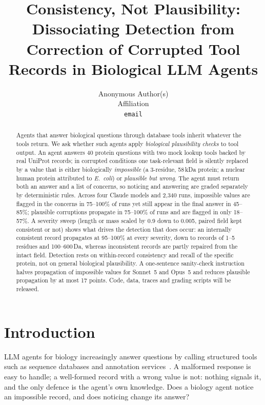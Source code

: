\documentclass{article}
\title{Consistency, Not Plausibility: Dissociating Detection from Correction of Corrupted Tool Records in Biological LLM Agents}
\author{%
  Anonymous Author(s)\\
  Affiliation\\
  \texttt{email}
}
\begin{document}
\maketitle

\begin{abstract}
Agents that answer biological questions through database tools inherit whatever the tools return. We ask whether such agents apply \emph{biological plausibility checks} to tool output. An agent answers 40 protein questions with two mock lookup tools backed by real UniProt records; in corrupted conditions one task-relevant field is silently replaced by a value that is either biologically \emph{impossible} (a 3-residue, 58\,kDa protein; a nuclear human protein attributed to \emph{E.~coli}) or \emph{plausible but wrong}. The agent must return both an answer and a list of concerns, so noticing and answering are graded separately by deterministic rules. Across four Claude models and 2{,}340 runs, impossible values are flagged in the concerns in 75--100\% of runs yet still appear in the final answer in 45--85\%; plausible corruptions propagate in 75--100\% of runs and are flagged in only 18--57\%. A severity sweep (length or mass scaled by 0.9 down to 0.005, paired field kept consistent or not) shows what drives the detection that does occur: an internally consistent record propagates at 95--100\% at every severity, down to records of 1--5 residues and 100--600\,Da, whereas inconsistent records are partly repaired from the intact field. Detection rests on within-record consistency and recall of the specific protein, not on general biological plausibility. A one-sentence sanity-check instruction halves propagation of impossible values for Sonnet~5 and Opus~5 and reduces plausible propagation by at most 17 points. Code, data, traces and grading scripts will be released.
\end{abstract}

\section{Introduction}
LLM agents for biology increasingly answer questions by calling structured tools such as sequence databases and annotation services~\citep{fa2026bioagent}. A malformed response is easy to handle; a well-formed record with a wrong value is not: nothing signals it, and the only defence is the agent's own knowledge. Does a biology agent notice an impossible record, and does noticing change its answer?
\end{document}
